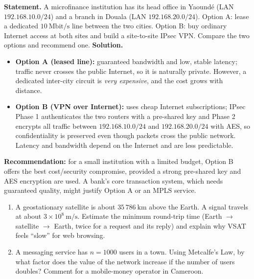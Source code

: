 \documentclass[11pt]{article}
\begin{document}
\begin{exoresolu}
\textbf{Statement.} A microfinance institution has its head office in Yaoundé (LAN $192.168.10.0/24$) and a branch in Douala (LAN $192.168.20.0/24$). Option A: lease a dedicated $10\ \mathrm{Mbit/s}$ line between the two cities. Option B: buy ordinary Internet access at both sites and build a site-to-site IPsec VPN. Compare the two options and recommend one.
\tcblower
\textbf{Solution.}
\begin{itemize}
\item \textbf{Option A (leased line):} guaranteed bandwidth and low, stable latency; traffic never crosses the public Internet, so it is naturally private. However, a dedicated inter-city circuit is \emph{very expensive}, and the cost grows with distance.
\item \textbf{Option B (VPN over Internet):} uses cheap Internet subscriptions; IPsec Phase 1 authenticates the two routers with a pre-shared key and Phase 2 encrypts all traffic between $192.168.10.0/24$ and $192.168.20.0/24$ with AES, so confidentiality is preserved even though packets cross the public network. Latency and bandwidth depend on the Internet and are less predictable.
\end{itemize}
\textbf{Recommendation:} for a small institution with a limited budget, Option B offers the best cost/security compromise, provided a strong pre-shared key and AES encryption are used. A bank's core transaction system, which needs guaranteed quality, might justify Option A or an MPLS service.
\end{exoresolu}

\begin{exercice}
\begin{enumerate}
\item A geostationary satellite is about $35\,786\ \mathrm{km}$ above the Earth. A signal travels at about $3\times 10^{8}\ \mathrm{m/s}$. Estimate the minimum round-trip time (Earth $\to$ satellite $\to$ Earth, twice for a request and its reply) and explain why VSAT feels ``slow'' for web browsing.
\item A messaging service has $n = 1000$ users in a town. Using Metcalfe's Law, by what factor does the value of the network increase if the number of users doubles? Comment for a mobile-money operator in Cameroon.
\end{enumerate}
\end{exercice}
\end{document}
